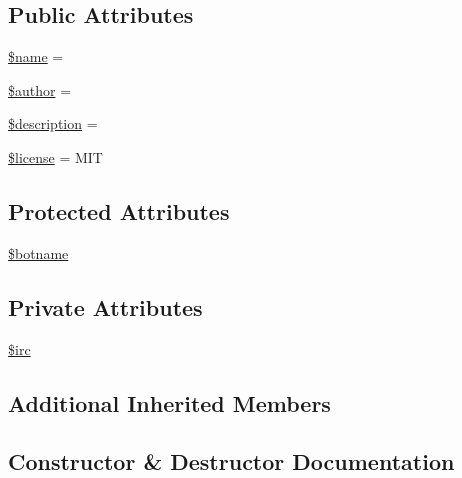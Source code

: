 \subsection*{Public Attributes}
\begin{DoxyCompactItemize}
\item 
\hyperlink{classNet__SmartIRC__module__example_aaebd09582fd081d9afff44777c85c8d8}{\$name} = \textquotesingle{}\textquotesingle{}
\item 
\hyperlink{classNet__SmartIRC__module__example_a84a5abd912985d58483093ee128d6aed}{\$author} = \textquotesingle{}\textquotesingle{}
\item 
\hyperlink{classNet__SmartIRC__module__example_ae66fb76a41befbcdb9ba370dd2a8aafd}{\$description} = \textquotesingle{}\textquotesingle{}
\item 
\hyperlink{classNet__SmartIRC__module__example_a768e94b6407b8020f8d388507ba3fbe1}{\$license} = \textquotesingle{}M\+IT\textquotesingle{}
\end{DoxyCompactItemize}
\subsection*{Protected Attributes}
\begin{DoxyCompactItemize}
\item 
\hyperlink{classNet__SmartIRC__module__example_abc743a5ef147b22e34a95b3893fcf8fb}{\$botname}
\end{DoxyCompactItemize}
\subsection*{Private Attributes}
\begin{DoxyCompactItemize}
\item 
\hyperlink{classNet__SmartIRC__module__example_a2d7ea47e77c4dc79aff1c43200e54c82}{\$irc}
\end{DoxyCompactItemize}
\subsection*{Additional Inherited Members}


\subsection{Constructor \& Destructor Documentation}
